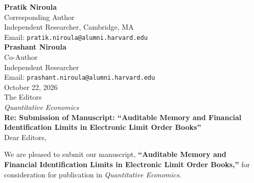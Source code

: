 \documentclass[11pt]{article}
\begin{document}
\thispagestyle{empty}

\noindent
\textbf{Pratik Niroula} \\
Corresponding Author \\
Independent Researcher, Cambridge, MA \\
Email: \texttt{pratik.niroula@alumni.harvard.edu} \\[0.5em]
\textbf{Prashant Niroula} \\
Co-Author \\
Independent Researcher \\
Email: \texttt{prashant.niroula@alumni.harvard.edu} \\[1.5em]

\noindent
October 22, 2026 \\[1.0em]

\noindent
The Editors \\
\textit{Quantitative Economics} \\[1.5em]

\noindent
\textbf{Re: Submission of Manuscript: ``Auditable Memory and Financial Identification Limits in Electronic Limit Order Books''} \\[1.0em]

\noindent
Dear Editors,

\vspace{0.5em}
We are pleased to submit our manuscript, \textbf{``Auditable Memory and Financial Identification Limits in Electronic Limit Order Books,''} for consideration for publication in \textit{Quantitative Economics}.
\end{document}
